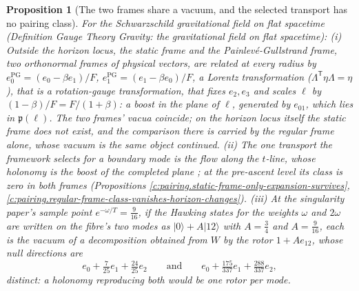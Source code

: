\documentclass[11pt]{article}
\newtheorem{proposition}[theorem]{Proposition}
\theoremstyle{definition}
\theoremstyle{plain}
\providecommand{\ket}{}\renewcommand{\ket}[1]{|#1\rangle}
\begin{document}
\begin{proposition}[The two frames share a vacuum, and the selected transport has no pairing class]\label{c:pairing.two-frames-share-vacuum-selected-transport}
For the Schwarzschild gravitational field on flat spacetime (Definition \emph{Gauge Theory Gravity: the gravitational field on flat spacetime}): (i) Outside the horizon locus, the static frame and the Painlev\'e-Gullstrand frame, two orthonormal frames of physical vectors, are related at every radius by $e_{0}^{\mathrm{PG}} = (e_{0} - \beta e_{1})/F$, $e_{1}^{\mathrm{PG}} = (e_{1} - \beta e_{0})/F$, a Lorentz transformation ($\Lambda^{\mathsf T}\eta\Lambda = \eta$), that is a rotation-gauge transformation, that fixes $e_{2}, e_{3}$ and scales $\ell$ by $(1 - \beta)/F = F/(1 + \beta)$: a boost in the plane of $\ell$, generated by $e_{01}$, which lies in $\mathfrak{p}(\ell)$. The two frames' vacua coincide; on the horizon locus itself the static frame does not exist, and the comparison there is carried by the regular frame alone, whose vacuum is the same object continued. (ii) The one transport the framework selects for a boundary mode is the flow along the $t$-line, whose holonomy is the boost of the completed plane \cite[Prop.~13.2(i)]{ButlerT5}; at the pre-ascent level its class is zero in both frames (Propositions \ref{c:pairing.static-frame-only-expansion-survives}, \ref{c:pairing.regular-frame-class-vanishes-horizon-changes}). (iii) At the singularity paper's sample point $e^{-\omega/T} = \tfrac{9}{16}$, if the Hawking states for the weights $\omega$ and $2\omega$ are written on the fibre's two modes as $\ket{0} + A\ket{12}$ with $A = \tfrac34$ and $A = \tfrac{9}{16}$, each is the vacuum of a decomposition obtained from $W$ by the rotor $1 + A e_{12}$, whose null directions are
\[
e_{0} + \tfrac{7}{25}e_{1} + \tfrac{24}{25}e_{2} \qquad\text{and}\qquad e_{0} + \tfrac{175}{337}e_{1} + \tfrac{288}{337}e_{2},
\]
distinct: a holonomy reproducing both would be one rotor per mode.
\end{proposition}
\end{document}
